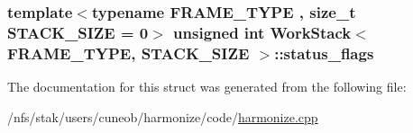 \hypertarget{structWorkStack_af135e2c1844ca4a3591b5456cf4c5850}{
\subsubsection[{status\-\_\-flags}]{\setlength{\rightskip}{0pt plus 5cm}template$<$typename F\-R\-A\-M\-E\-\_\-\-T\-Y\-P\-E , size\-\_\-t S\-T\-A\-C\-K\-\_\-\-S\-I\-Z\-E = 0$>$ unsigned int {\bf Work\-Stack}$<$ F\-R\-A\-M\-E\-\_\-\-T\-Y\-P\-E, S\-T\-A\-C\-K\-\_\-\-S\-I\-Z\-E $>$\-::status\-\_\-flags}}\label{structWorkStack_af135e2c1844ca4a3591b5456cf4c5850}


The documentation for this struct was generated from the following file\-:\begin{DoxyCompactItemize}
\item 
/nfs/stak/users/cuneob/harmonize/code/\hyperlink{harmonize_8cpp}{harmonize.\-cpp}\end{DoxyCompactItemize}
